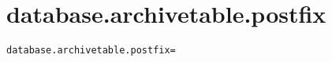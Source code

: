 \section{database.archivetable.postfix}
\label{configuration:DatabaseArchivetablePostfix}
\AvailableInJavaOnly{\TODO}
\begin{lstlisting}[style=Props,caption={Usage example for \textit{database.archivetable.postfix}}]
database.archivetable.postfix=
\end{lstlisting}